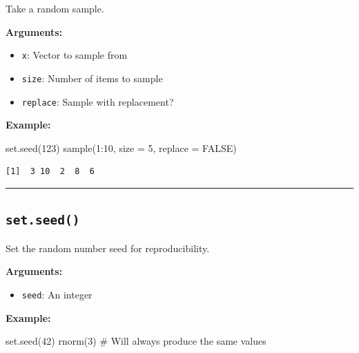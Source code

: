 \documentclass[
  letterpaper,
  DIV=11,
  numbers=noendperiod]{scrreprt}
\newenvironment{Shaded}{\begin{snugshade}}{\end{snugshade}}
\newcommand{\AttributeTok}[1]{\textcolor[rgb]{0.40,0.45,0.13}{#1}}
\newcommand{\CommentTok}[1]{\textcolor[rgb]{0.37,0.37,0.37}{#1}}
\newcommand{\ConstantTok}[1]{\textcolor[rgb]{0.56,0.35,0.01}{#1}}
\newcommand{\DecValTok}[1]{\textcolor[rgb]{0.68,0.00,0.00}{#1}}
\newcommand{\FunctionTok}[1]{\textcolor[rgb]{0.28,0.35,0.67}{#1}}
\newcommand{\NormalTok}[1]{\textcolor[rgb]{0.00,0.23,0.31}{#1}}
\newcommand{\SpecialCharTok}[1]{\textcolor[rgb]{0.37,0.37,0.37}{#1}}
\providecommand{\tightlist}{%
  \setlength{\itemsep}{0pt}\setlength{\parskip}{0pt}}
\begin{document}
Take a random sample.

\textbf{Arguments:}

\begin{itemize}
\tightlist
\item
  \texttt{x}: Vector to sample from
\item
  \texttt{size}: Number of items to sample
\item
  \texttt{replace}: Sample with replacement?
\end{itemize}

\textbf{Example:}

\begin{Shaded}
\begin{Highlighting}[]
\FunctionTok{set.seed}\NormalTok{(}\DecValTok{123}\NormalTok{)}
\FunctionTok{sample}\NormalTok{(}\DecValTok{1}\SpecialCharTok{:}\DecValTok{10}\NormalTok{, }\AttributeTok{size =} \DecValTok{5}\NormalTok{, }\AttributeTok{replace =} \ConstantTok{FALSE}\NormalTok{)}
\end{Highlighting}
\end{Shaded}

\begin{verbatim}
[1]  3 10  2  8  6
\end{verbatim}

\begin{center}\rule{0.5\linewidth}{0.5pt}\end{center}

\subsection{\texorpdfstring{\texttt{set.seed()}}{set.seed()}}\label{set.seed}

Set the random number seed for reproducibility.

\textbf{Arguments:}

\begin{itemize}
\tightlist
\item
  \texttt{seed}: An integer
\end{itemize}

\textbf{Example:}

\begin{Shaded}
\begin{Highlighting}[]
\FunctionTok{set.seed}\NormalTok{(}\DecValTok{42}\NormalTok{)}
\FunctionTok{rnorm}\NormalTok{(}\DecValTok{3}\NormalTok{)  }\CommentTok{\# Will always produce the same values}
\end{Highlighting}
\end{Shaded}
\end{document}
